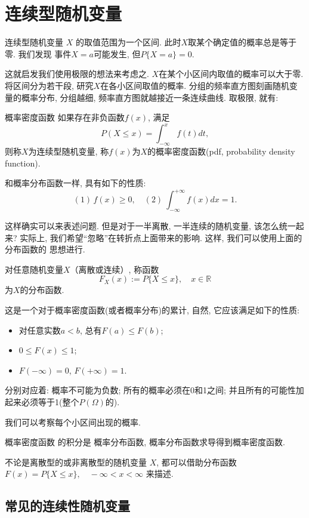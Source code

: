 \section{连续型随机变量}
连续型随机变量 $X$ 的取值范围为一个区间. 此时$X$取某个确定值的概率总是等于零. 我们发现
事件$X=a$可能发生, 但$P\{X=a\}=0$. 

这就启发我们使用极限的想法来考虑之. $X$在某个小区间内取值的概率可以大于零. 
将区间分为若干段, 研究$X$在各小区间取值的概率. 分组的频率直方图刻画随机变量的概率分布,
分组越细, 频率直方图就越接近一条连续曲线. 取极限, 就有:

\begin{definition}{概率密度函数}
    如果存在非负函数$f(x)$, 满足
    $$
        P(X\leq x)=\int_{-\infty}^{x}f(t)dt,
    $$
    则称$X$为连续型随机变量, 称$f(x)$为$X$的概率密度函数(pdf, probability density function).
\end{definition}

和概率分布函数一样, 具有如下的性质:
$$
    (1)\,f(x)\ge 0,\quad (2)\ \int_{-\infty}^{+\infty}f(x)dx=1.
$$

这样确实可以来表述问题. 但是对于一半离散, 一半连续的随机变量, 该怎么统一起来?
实际上, 我们希望``忽略''在转折点上面带来的影响. 这样, 我们可以使用上面的分布函数的
思想进行.

\begin{definition}
    对任意随机变量$X$（离散或连续）, 称函数
    $$F_X(x):=P\{X\le x\},\quad x\in \mathbb{R}$$
    为$X$的分布函数. 
\end{definition}
这是一个对于概率密度函数(或者概率分布)的累计, 自然, 它应该满足如下的性质:

\begin{itemize}
    \item 对任意实数$a<b$, 总有$F(a)\le F(b)$;
    \item $0 \le F(x) \le 1$; 
    \item $F(-\infty)=0$, $F(+\infty)=1$. 
\end{itemize}
分别对应着: 概率不可能为负数; 所有的概率必须在0和1之间; 并且所有的可能性加起来必须等于1(整个$P(\Omega)$的).
\begin{takeaway}
    我们可以考察每个小区间出现的概率.

    概率密度函数 的积分是 概率分布函数, 概率分布函数求导得到概率密度函数.

    不论是离散型的或非离散型的随机变量 $X$, 都可以借助分布函数$F(x)=P\{X \leqslant x\}, \quad-\infty<x<\infty$
    来描述.
\end{takeaway}
\subsection{常见的连续性随机变量}

